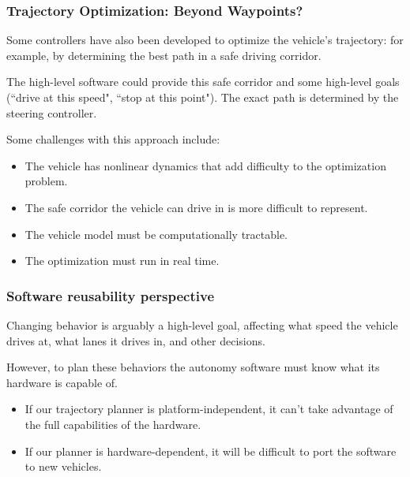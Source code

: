 \documentclass{beamer}
\begin{document}
\begin{frame}
\frametitle{Trajectory Optimization: Beyond Waypoints?}
Some controllers have also been developed to optimize the vehicle's trajectory: for example, by determining the best path in a safe driving corridor.

The high-level software could provide this safe corridor and some high-level goals (``drive at this speed", ``stop at this point"). The exact path is determined by the steering controller.

Some challenges with this approach include:
\begin{itemize}
	\item The vehicle has nonlinear dynamics that add difficulty to the optimization problem.
	\item The safe corridor the vehicle can drive in is more difficult to represent.
	\item The vehicle model must be computationally tractable.
	\item The optimization must run in real time.
\end{itemize}
\end{frame}
	
	
	
	\begin{frame}
	\frametitle{Software reusability perspective}
	Changing behavior is arguably a high-level goal, affecting what speed the vehicle drives at, what lanes it drives in, and other decisions.
	
	However, to plan these behaviors the autonomy software must know what its hardware is capable of.
	\begin{itemize}
		\item If our trajectory planner is platform-independent, it can't take advantage of the full capabilities of the hardware.
		
		\item If our planner is hardware-dependent, it will be difficult to port the software to new vehicles.
	\end{itemize}

\end{frame}
	
\end{document}
